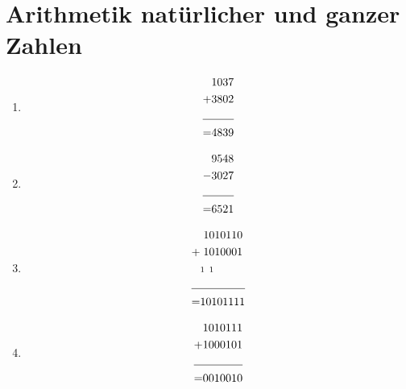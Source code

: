 \documentclass[DIN, pagenumber=false, fontsize=11pt, parskip=half]{scrartcl}
\begin{document}
    \section{Arithmetik natürlicher und ganzer Zahlen}
    \begin{enumerate}
        \item 
            \begin{align*}
                & 1037 \\
                + & \hspace{0.0cm} 3802  \\
                \cline{1-2}  
                = &4839  
            \end{align*}
        \item 
            \begin{align*}
                & 9548\\
                - & \hspace{0.0cm} 3027  \\
                \cline{1-2}  
                = &6521  
            \end{align*}
        \item 
            \begin{align*}
                & \hspace{0.1cm} 1010110\\
                + & \hspace{0.1cm}1010001 \\
                & \hspace{0.0cm} {\scriptstyle 1\, \, \, 1} \\
                \cline{1-2}  
                = &10101111
            \end{align*}
        \item 
            \begin{align*}
                & \hspace{0.0cm} 1010111\\
                + & \hspace{0.0cm}1000101 \\
                \cline{1-2}  
                = &0010010
            \end{align*}
    \end{enumerate}
\end{document}
